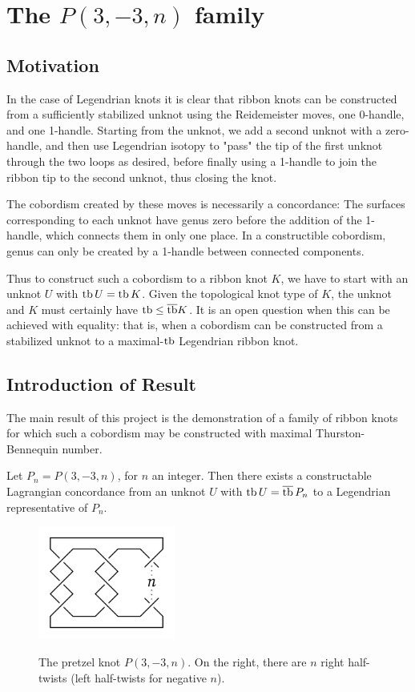 \chapter{The \texorpdfstring{$P(3, -3, n)$}{P(3, -3, n)} family}
\section{Motivation}
In the case of Legendrian knots it is clear that ribbon knots can be constructed from a sufficiently stabilized unknot using the Reidemeister moves, one 0-handle, and one 1-handle. 
Starting from the unknot, we add a second unknot with a zero-handle, and then use Legendrian isotopy to "pass" the tip of the first unknot through the two loops as desired, before finally using a 1-handle to join the ribbon tip to the second unknot, thus closing the knot. 

The cobordism created by these moves is necessarily a concordance: The surfaces corresponding to each unknot have genus zero before the addition of the 1-handle, which connects them in only one place. In a constructible cobordism, genus can only be created by a 1-handle between connected components.

Thus to construct such a cobordism to a ribbon knot $K$, we have to start with an unknot $U$ with $\operatorname{tb} U = \operatorname{tb} K$. Given the topological knot type of $K$, the unknot and $K$ must certainly have $\operatorname{tb} \leq \overline{\operatorname{tb}} K$.
It is an open question when this can be achieved with equality: that is, when a cobordism can be constructed from a stabilized unknot to a maximal-$\operatorname{tb}$ Legendrian ribbon knot.

\section{Introduction of Result}
The main result of this project is the demonstration of a family of ribbon knots for which such a cobordism may be constructed with maximal Thurston-Bennequin number.

\begin{theorem}\label{thm:mine}
    Let $P_n = P(3, -3, n)$, for $n$ an integer. Then there exists a constructable Lagrangian concordance from an unknot $U$ with $\operatorname{tb} U = \overline{\operatorname{tb}}\, P_n$ to a Legendrian representative of $P_n$.
\end{theorem}

\begin{figure}[ht!]
    \centering
    \includegraphics[width=0.4\textwidth]{images/pretzel-knot.pdf}
    \label{fig:pretzel-knot}
    \caption{The pretzel knot $P(3, -3, n)$. On the right, there are $n$ right half-twists (left half-twists for negative $n$).}
\end{figure}

